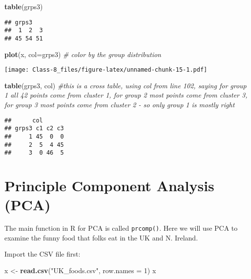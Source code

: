 \documentclass[]{article}
\newenvironment{Shaded}{\begin{snugshade}}{\end{snugshade}}
\newcommand{\CommentTok}[1]{\textcolor[rgb]{0.56,0.35,0.01}{\textit{#1}}}
\newcommand{\DataTypeTok}[1]{\textcolor[rgb]{0.13,0.29,0.53}{#1}}
\newcommand{\DecValTok}[1]{\textcolor[rgb]{0.00,0.00,0.81}{#1}}
\newcommand{\KeywordTok}[1]{\textcolor[rgb]{0.13,0.29,0.53}{\textbf{#1}}}
\newcommand{\NormalTok}[1]{#1}
\newcommand{\StringTok}[1]{\textcolor[rgb]{0.31,0.60,0.02}{#1}}
\begin{document}
\begin{Shaded}
\begin{Highlighting}[]
\KeywordTok{table}\NormalTok{(grps3)}
\end{Highlighting}
\end{Shaded}

\begin{verbatim}
## grps3
##  1  2  3 
## 45 54 51
\end{verbatim}

\begin{Shaded}
\begin{Highlighting}[]
\KeywordTok{plot}\NormalTok{(x, }\DataTypeTok{col=}\NormalTok{grps3) }\CommentTok{# color by the group distribution}
\end{Highlighting}
\end{Shaded}

\texttt{[image: Class-8\_files/figure-latex/unnamed-chunk-15-1.pdf]}

\begin{Shaded}
\begin{Highlighting}[]
\KeywordTok{table}\NormalTok{(grps3, col) }\CommentTok{#this is a cross table, using col from line 102, saying for group 1 all 42 points come from cluster 1, for group 2 most points come from cluster 3, for group 3 most points come from cluster 2 - so only group 1 is mostly right}
\end{Highlighting}
\end{Shaded}

\begin{verbatim}
##      col
## grps3 c1 c2 c3
##     1 45  0  0
##     2  5  4 45
##     3  0 46  5
\end{verbatim}

\hypertarget{principle-component-analysis-pca}{%
\section{Principle Component Analysis
(PCA)}\label{principle-component-analysis-pca}}

The main function in R for PCA is called \texttt{prcomp()}. Here we will
use PCA to examine the funny food that folks eat in the UK and N.
Ireland.

Import the CSV file first:

\begin{Shaded}
\begin{Highlighting}[]
\NormalTok{x <-}\StringTok{ }\KeywordTok{read.csv}\NormalTok{(}\StringTok{"UK_foods.csv"}\NormalTok{, }\DataTypeTok{row.names =} \DecValTok{1}\NormalTok{)}
\NormalTok{x}
\end{Highlighting}
\end{Shaded}
\end{document}
